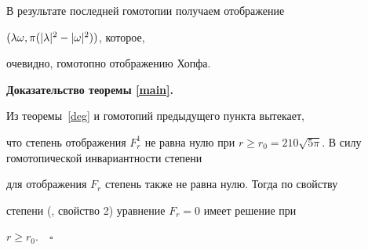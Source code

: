 В результате последней гомотопии получаем отображение


$(\lambda \omega ,\pi(|\lambda |^2-|\omega |^2))$, которое,


очевидно, гомотопно отображению Хопфа. 


\medskip





{\bf Доказательство теоремы \ref{main}.}


Из теоремы~\ref{deg} и гомотопий предыдущего пункта вытекает,


что степень отображения $F_r^1$ не равна нулю при $r\ge


r_0=210\sqrt{5\pi}$. В силу гомотопической инвариантности степени


для отображения $F_r$ степень также не равна нулю. Тогда по свойству


степени (\cite{moe2}, свойство 2) уравнение $F_r=0$ имеет решение при


$r\ge r_0.\quad\square$





